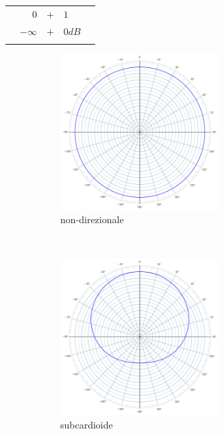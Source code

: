 \begin{table}[ht]
\begin{center}
\begin{tabular}{rrcll}
                & $0$          & $+$ & $1$                  & \\
                & $-\infty$    & $+$ & $0dB$            & \\ %
& \\
\end{tabular}
\end{center}
\label{tab:polarcoef}
\end{table}

\clearpage

\begin{figure}[h]
    \centering
    \begin{subfigure}[t]{0.48\textwidth}
        \centering
        \includegraphics[height=6cm]{CAPITOLI/_TIKZ/POLAR/omni}
        \caption{non-direzionale}%
        \label{pol:omni-p}
    \end{subfigure}%
    ~
    \begin{subfigure}[t]{0.48\textwidth}
        \centering
        \includegraphics[height=6cm]{CAPITOLI/_TIKZ/POLAR/subcardioid}
        \caption{subcardioide}%
        \label{pol:sub-p}
    \end{subfigure}
    \\
    \begin{subfigure}[t]{0.48\textwidth}

\end{subfigure}
\end{figure}

